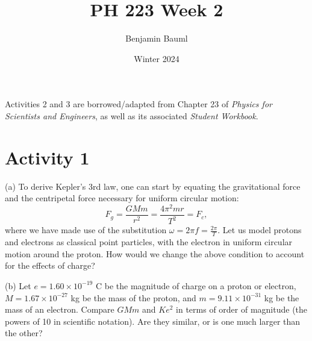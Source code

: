 \documentclass[]{article}
\title{PH 223 Week 2}
\author{Benjamin Bauml}
\date{Winter 2024}
\begin{document}
\maketitle

\begin{center}
	Activities 2 and 3 are borrowed/adapted from Chapter 23 of \textit{Physics for Scientists and Engineers}, as well as its associated \textit{Student Workbook}.

\end{center}
\section*{Activity 1}%

(a) To derive Kepler's 3rd law, one can start by equating the gravitational force and the centripetal force necessary for uniform circular motion:
\[
F_{g} = \frac{GMm}{r^{2}} = \frac{4\pi^{2}mr}{T^{2}} = F_{c},
\]
where we have made use of the substitution $ \omega = 2\pi f = \frac{2\pi}{T} $. Let us model protons and electrons as classical point particles, with the electron in uniform circular motion around the proton. How would we change the above condition to account for the effects of charge?

\iffalse
\phantom{\parbox{\textwidth}{
To account for the Coulomb interaction, we need to insert a term of the form
\[
\frac{Kq_{1}q_{2}}{r^{2}}.
\]
The charge on an electron is $ -e $, and the charge on a proton is $ +e $, which would make the force between the two particles attractive. As such, the magnitude of the Coulomb force between a proton and an electron (which is $ \frac{Ke^{2}}{r^{2}} $) adds to the attractive gravitational force to create the net centripetal force. Our equation should be
\[
\frac{GMm}{r^{2}} + \frac{Ke^{2}}{r^{2}} = \frac{4\pi^{2}mr}{T^{2}}.
\]
}}
\fi


(b) Let $ e = 1.60\times10^{-19} $ C be the magnitude of charge on a proton or electron, $ M = 1.67\times10^{-27} $ kg be the mass of the proton, and $ m = 9.11\times10^{-31} $ kg be the mass of an electron. Compare $ GMm $ and $ Ke^{2} $ in terms of order of magnitude (the powers of 10 in scientific notation). Are they similar, or is one much larger than the other?
\end{document}
